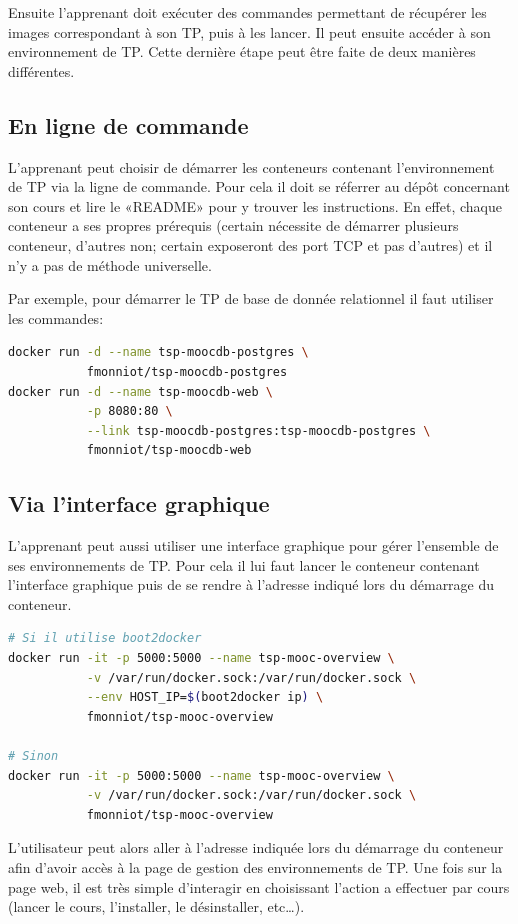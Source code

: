 \documentclass[a4paper,11pt]{report}
\begin{document}
Ensuite l'apprenant doit exécuter des commandes permettant de récupérer les images correspondant à son TP, puis à les lancer. Il peut ensuite accéder à son environnement de TP. Cette dernière étape peut être faite de deux manières différentes.

\subsection{En ligne de commande}

L'apprenant peut choisir de démarrer les conteneurs contenant l'environnement de TP via la ligne de commande. Pour cela il doit se réferrer au dépôt concernant son cours et lire le «README» pour y trouver les instructions. En effet, chaque conteneur a ses propres prérequis (certain nécessite de démarrer plusieurs conteneur, d'autres non; certain exposeront des port TCP et pas d'autres) et il n'y a pas de méthode universelle.

Par exemple, pour démarrer le TP de base de donnée relationnel il faut utiliser les commandes:

\begin{lstlisting}[language=Bash,caption={Démarrer les conteneurs du MOOC de base de donnée}]
docker run -d --name tsp-moocdb-postgres \
           fmonniot/tsp-moocdb-postgres
docker run -d --name tsp-moocdb-web \
           -p 8080:80 \
           --link tsp-moocdb-postgres:tsp-moocdb-postgres \
           fmonniot/tsp-moocdb-web
\end{lstlisting}


\subsection{Via l'interface graphique}

L'apprenant peut aussi utiliser une interface graphique pour gérer l'ensemble de ses environnements de TP. Pour cela il lui faut lancer le conteneur contenant l'interface graphique puis de se rendre à l'adresse indiqué lors du démarrage du conteneur.

\begin{lstlisting}[language=Bash,caption={Démarrer le conteneur Overview}]
# Si il utilise boot2docker
docker run -it -p 5000:5000 --name tsp-mooc-overview \
           -v /var/run/docker.sock:/var/run/docker.sock \
           --env HOST_IP=$(boot2docker ip) \
           fmonniot/tsp-mooc-overview

# Sinon
docker run -it -p 5000:5000 --name tsp-mooc-overview \
           -v /var/run/docker.sock:/var/run/docker.sock \
           fmonniot/tsp-mooc-overview
\end{lstlisting}

L'utilisateur peut alors aller à l'adresse indiquée lors du démarrage du conteneur afin d'avoir accès à la page de gestion des environnements de TP.
Une fois sur la page web, il est très simple d'interagir en choisissant l'action a effectuer par cours (lancer le cours, l'installer, le désinstaller, etc…).
\thispagestyle{fancy}
\printbibliography
\thispagestyle{fancy}
\lstlistoflistings
\thispagestyle{fancy}
\listoffigures
\thispagestyle{fancy}
\end{document}
